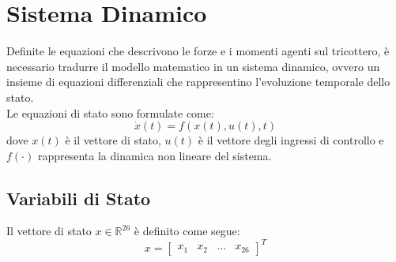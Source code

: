 \section{Sistema Dinamico}
Definite le equazioni che descrivono le forze e i momenti agenti sul tricottero, è necessario tradurre il modello matematico in un sistema dinamico, ovvero un insieme di equazioni differenziali che rappresentino l'evoluzione temporale dello stato.
\\Le equazioni di stato sono formulate come:
\begin{equation}
    \dot{x}(t) = f(x(t), u(t), t)
\end{equation}
dove $x(t)$ è il vettore di stato, $u(t)$ è il vettore degli ingressi di controllo e $f(\cdot)$ rappresenta la dinamica non lineare del sistema.
\clearpage


\subsection{Variabili di Stato}
Il vettore di stato $x \in \mathbb{R}^{26}$ è definito come segue:
\begin{equation}
    x = \begin{bmatrix} x_1 & x_2 & \dots & x_{26} \end{bmatrix}^T
\end{equation}

